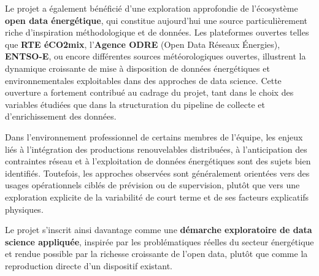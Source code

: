 Le projet a également bénéficié d’une exploration approfondie de l’écosystème \textbf{open data énergétique},
qui constitue aujourd’hui une source particulièrement riche d’inspiration méthodologique et de données.
Les plateformes ouvertes telles que \textbf{RTE éCO2mix}, l’\textbf{Agence ODRE} (Open Data Réseaux Énergies),
\textbf{ENTSO-E}, ou encore différentes sources météorologiques ouvertes, illustrent la dynamique croissante
de mise à disposition de données énergétiques et environnementales exploitables dans des approches
de data science. Cette ouverture a fortement contribué au cadrage du projet, tant dans le choix des
variables étudiées que dans la structuration du pipeline de collecte et d’enrichissement des données.

Dans l’environnement professionnel de certains membres de l’équipe, les enjeux liés à l’intégration des
productions renouvelables distribuées, à l’anticipation des contraintes réseau et à l’exploitation de
données énergétiques sont des sujets bien identifiés. Toutefois, les approches observées sont
généralement orientées vers des usages opérationnels ciblés de prévision ou de supervision, plutôt que
vers une exploration explicite de la variabilité de court terme et de ses facteurs explicatifs physiques.

Le projet s’inscrit ainsi davantage comme une \textbf{démarche exploratoire de data science appliquée},
inspirée par les problématiques réelles du secteur énergétique et rendue possible par la richesse
croissante de l’open data, plutôt que comme la reproduction directe d’un dispositif existant.
